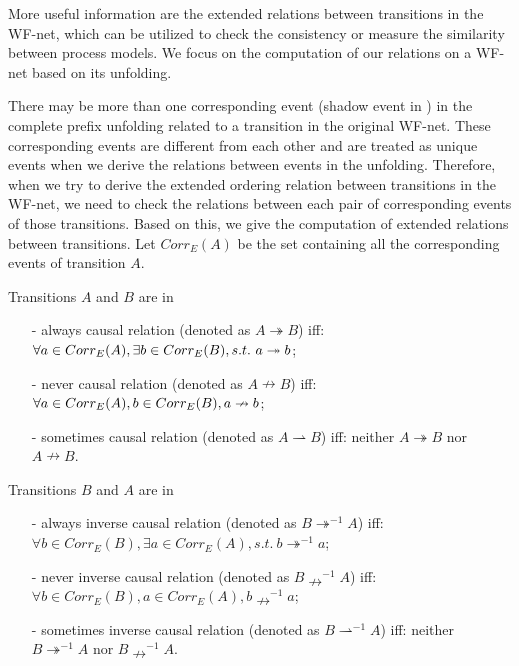 \documentclass{llncs}
\begin{document}
More useful information are the extended relations between transitions in the WF-net, which can be utilized to check the consistency or measure the similarity between process models. We focus on the computation of our relations on a WF-net based on its unfolding.

There may be more than one corresponding event (shadow event in \cite{wang2013efficient}) in the complete prefix unfolding related to a transition in the original WF-net. These corresponding events are different from each other and are treated as unique events when we derive the relations between events in the unfolding. Therefore, when we try to derive the extended ordering relation between transitions in the WF-net, we need to check the relations between each pair of corresponding events of those transitions. Based on this, we give the computation of extended relations between transitions. Let $Corr_{E}(A)$ be the set containing all the corresponding events of transition $A$.

\begin{definition}\label{def:causalRelations}
Transitions $A$ and $B$ are in
	\begin{itemize}
		\item[-] always causal relation (denoted as $A\twoheadrightarrow B$) iff: $\forall a\in Corr_{E}(A), \exists b\in Corr_{E}(B),\\s.t.~a\twoheadrightarrow b$;
		\item[-] never causal relation (denoted as $A\nrightarrow B$) iff: $\forall a\in Corr_{E}(A), b\in Corr_{E}(B),\\a\nrightarrow b$;
		\item[-] sometimes causal relation (denoted as $A\rightharpoonup B$) iff: neither $A\twoheadrightarrow B$ nor $A\nrightarrow B$.
	\end{itemize}
\end{definition}

\begin{definition}\label{def:inverseCausalRelations}
Transitions $B$ and $A$ are in
	\begin{itemize}
		\item[-] always inverse causal relation (denoted as $B\twoheadrightarrow^{-1}A$) iff: $\forall b\in Corr_{E}(B), \exists a\in Corr_{E}(A), s.t.~b\twoheadrightarrow^{-1}a$;
		\item[-] never inverse causal relation (denoted as $B\nrightarrow^{-1}A$) iff: $\forall b\in Corr_{E}(B), a\in Corr_{E}(A), b\nrightarrow^{-1}a$;
		\item[-] sometimes inverse causal relation (denoted as $B\rightharpoonup^{-1}A$) iff: neither $B\twoheadrightarrow^{-1}A$ nor $B\nrightarrow^{-1}A$.
	\end{itemize}
\end{definition}
\end{document}
